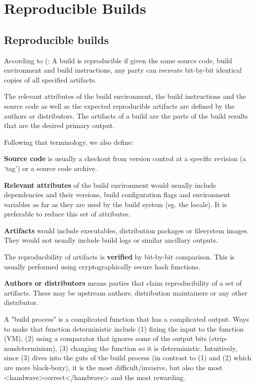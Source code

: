 \section{Reproducible Builds}
\label{SEC:reproducible-builds}


\subsection{Reproducible builds}

According to (:
A build is reproducible if given the same source code, build environment
and build instructions, any party can recreate bit-by-bit identical copies
of all specified artifacts.

The relevant attributes of the build environment, the build instructions
and the source code as well as the expected reproducible artifacts are
defined by the authors or distributors. The artifacts of a build are the
parts of the build results that are the desired primary output.


Following that terminology, we also define:

{\bf Source code} is usually a checkout from version control at a specific
revision (a `tag') or a source code archive.

{\bf Relevant attributes} of the build environment would usually include
dependencies and their versions, build configuration flags and environment
variables as far as they are used by the build system (eg. the locale). It
is preferable to reduce this set of attributes.

{\bf Artifacts} would include executables, distribution packages or filesystem
images. They would not usually include build logs or similar ancillary
outputs.

The reproducibility of artifacts is {\bf verified} by bit-by-bit comparison. 
This is usually performed using cryptographically secure hash functions.

{\bf Authors or distributors} means parties that claim reproducibility of a 
set of artifacts. These may be upstream authors, distribution maintainers or
any other distributor.

A "build process" is
a complicated function that has a complicated output.  Ways to make that
function deterministic include (1) fixing the input to the function
(VM), (2) using a comparator that ignores some of the output bits
(strip-nondeterminism), (3) changing the function so it is
deterministic.  Intuitively, since (3) dives into the guts of the build
process (in contrast to (1) and (2) which are more black-boxy), it is
the most difficult/invasive, but also the most <handwave>correct</handwave>
and the most rewarding.

